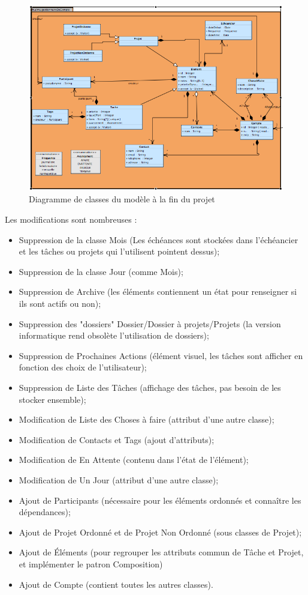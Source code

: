 \begin{figure}[!ht]
\begin{center}
\includegraphics[width=12cm]{images/ClassDiagram.png}
\caption{Diagramme de classes du modèle à la fin du projet}
\label{ddcfinal}
\end{center}
\end{figure}


Les modifications sont nombreuses :
\begin{itemize}
\item Suppression de la classe Mois (Les échéances sont stockées dans l'échéancier et les tâches ou projets qui l'utilisent pointent dessus);
\item Suppression de la classe Jour (comme Mois);
\item Suppression de Archive (les éléments contiennent un état pour renseigner si ils sont actifs ou non);
\item Suppression des "dossiers" Dossier/Dossier à projets/Projets (la version informatique rend obsolète l'utilisation de dossiers);
\item Suppression de Prochaines Actions (élément visuel, les tâches sont afficher en fonction des choix de l'utilisateur);
\item Suppression de Liste des Tâches (affichage des tâches, pas besoin de les stocker ensemble);
\item Modification de Liste des Choses à faire (attribut d'une autre classe);
\item Modification de Contacts et Tags (ajout d'attributs);
\item Modification de En Attente (contenu dans l'état de l'élément);
\item Modification de Un Jour (attribut d'une autre classe);
\item Ajout de Participants (nécessaire pour les éléments ordonnés et connaître les dépendances);
\item Ajout de Projet Ordonné et de Projet Non Ordonné (sous classes de Projet);
\item Ajout de Éléments (pour regrouper les attributs commun de Tâche et Projet, et implémenter le patron Composition)
\item Ajout de Compte (contient toutes les autres classes).
\end{itemize}

